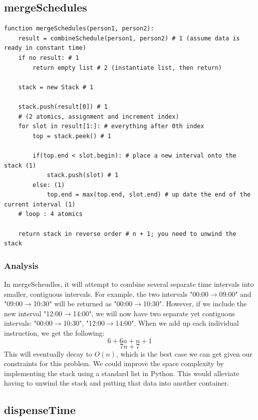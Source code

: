 \documentclass{article}
\begin{document}
\newpage

\subsection{mergeSchedules}

\begin{verbatim}
function mergeSchedules(person1, person2):
    result = combineSchedule(person1, person2) # 1 (assume data is ready in constant time)
    if no result: # 1
        return empty list # 2 (instantiate list, then return)
    
    stack = new Stack # 1

    stack.push(result[0]) # 1
    # (2 atomics, assignment and increment index)
    for slot in result[1:]: # everything after 0th index 
        top = stack.peek() # 1
        
        if(top.end < slot.begin): # place a new interval onto the stack (1)
            stack.push(slot) # 1
        else: (1)
            top.end = max(top.end, slot.end) # up date the end of the current interval (1)
    # loop : 4 atomics
    
    return stack in reverse order # n + 1; you need to unwind the stack

\end{verbatim}

\subsubsection{Analysis}

In mergeScheudles, it will attempt to combine several separate time intervals into smaller, contiguous intervals.
For example, the two intervals "00:00$\rightarrow$09:00" and "09:00$\rightarrow$10:30" will be returned as "00:00$\rightarrow$10:30".
However, if we include the new interval "12:00$\rightarrow$14:00", we will now have two separate yet contiguous intervals: "00:00$\rightarrow$10:30", "12:00$\rightarrow$14:00".
When we add up each individual instruction, we get the following: \\
$$6 + 6n + n + 1$$
$$7n + 7$$
This will eventually decay to $O(n)$, which is the best case we can get given our constraints for this problem.
We could improve the space complexity by implementing the stack using a standard list in Python.
This would alleviate having to unwind the stack and putting that data into another container.

\newpage

\subsection{dispenseTime}
\end{document}
